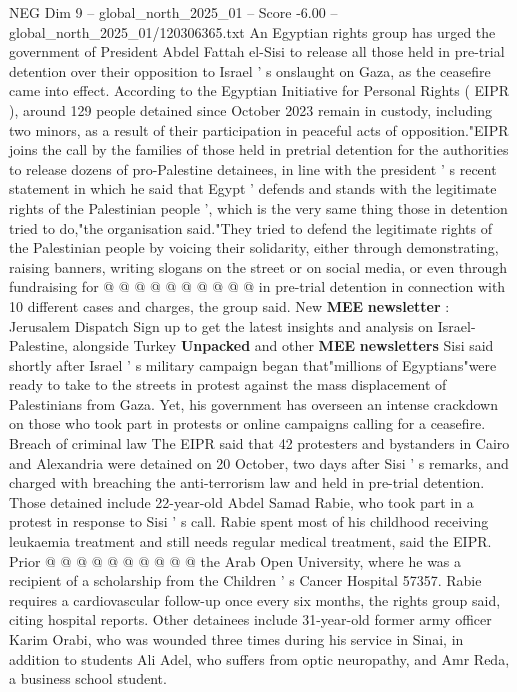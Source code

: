 \begin{textsample}{NEG Dim 9 – global\_north\_2025\_01 – Score -6.00 – global\_north\_2025\_01/120306365.txt}  \label{ex:f9_neg_103}
An Egyptian rights group has urged the government of President Abdel Fattah el-Sisi to release all those held in pre-trial detention over their opposition to Israel ' s onslaught on Gaza, as the ceasefire came into effect.
According to the Egyptian Initiative for Personal Rights ( EIPR ), around 129 people detained since October 2023 remain in custody, including two minors, as a result of their participation in peaceful acts of opposition."EIPR joins the call by the families of those held in pretrial detention for the authorities to release dozens of pro-Palestine detainees, in line with the president ' s recent statement in which he said that Egypt ' defends and stands with the legitimate rights of the Palestinian people ', which is the very same thing those in detention tried to do,"the organisation said."They tried to defend the legitimate rights of the Palestinian people by voicing their solidarity, either through demonstrating, raising banners, writing slogans on the street or on social media, or even through fundraising for @ @ @ @ @ @ @ @ @ @ in pre-trial detention in connection with 10 different cases and charges, the group said.
New \textbf{MEE} \textbf{newsletter} : Jerusalem Dispatch Sign up to get the latest insights and analysis on Israel-Palestine, alongside Turkey \textbf{Unpacked} and other \textbf{MEE} \textbf{newsletters} Sisi said shortly after Israel ' s military campaign began that"millions of Egyptians"were ready to take to the streets in protest against the mass displacement of Palestinians from Gaza.
Yet, his government has overseen an intense crackdown on those who took part in protests or online campaigns calling for a ceasefire.
Breach of criminal law The EIPR said that 42 protesters and bystanders in Cairo and Alexandria were detained on 20 October, two days after Sisi ' s remarks, and charged with breaching the anti-terrorism law and held in pre-trial detention.
Those detained include 22-year-old Abdel Samad Rabie, who took part in a protest in response to Sisi ' s call.
Rabie spent most of his childhood receiving leukaemia treatment and still needs regular medical treatment, said the EIPR.
Prior @ @ @ @ @ @ @ @ @ @ the Arab Open University, where he was a recipient of a scholarship from the Children ' s Cancer Hospital 57357.
Rabie requires a cardiovascular follow-up once every six months, the rights group said, citing hospital reports.
Other detainees include 31-year-old former army officer Karim Orabi, who was wounded three times during his service in Sinai, in addition to students Ali Adel, who suffers from optic neuropathy, and Amr Reda, a business school student.

\end{textsample}
